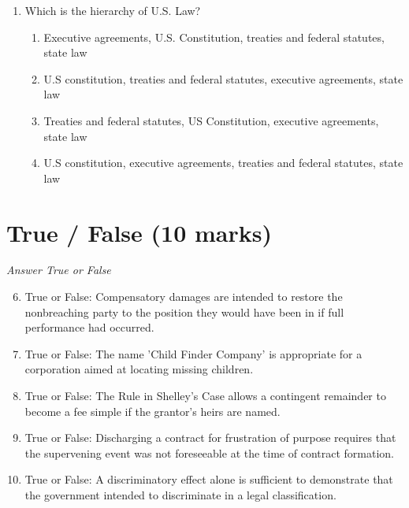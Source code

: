 \documentclass[12pt]{article}
\begin{document}
\begin{enumerate}[label=\arabic*.]
\begin{enumerate}[label=(\alph*)]
    \item Pay just compensation for the property
    \item Terminate the regulation and pay damages that occurred while regulation was in effect
    \item Pay double damages if not addressed in 30 days.
    \item a or b
\end{enumerate}
\item Which is the hierarchy of U.S. Law?
\begin{enumerate}[label=(\alph*)]
    \item Executive agreements, U.S. Constitution, treaties and federal statutes, state law
    \item U.S constitution, treaties and federal statutes, executive agreements, state law
    \item Treaties and federal statutes, US Constitution, executive agreements, state law
    \item U.S constitution, executive agreements, treaties and federal statutes, state law
\end{enumerate}
\end{enumerate}

\section*{True / False (10 marks)}
\textit{Answer True or False}
\begin{enumerate}[label=\arabic*.]
\setcounter{enumi}{5}
\item True or False: Compensatory damages are intended to restore the nonbreaching party to the position they would have been in if full performance had occurred.
\item True or False: The name 'Child Finder Company' is appropriate for a corporation aimed at locating missing children.
\item True or False: The Rule in Shelley's Case allows a contingent remainder to become a fee simple if the grantor's heirs are named.
\item True or False: Discharging a contract for frustration of purpose requires that the supervening event was not foreseeable at the time of contract formation.
\item True or False: A discriminatory effect alone is sufficient to demonstrate that the government intended to discriminate in a legal classification.
\end{enumerate}
\end{document}
